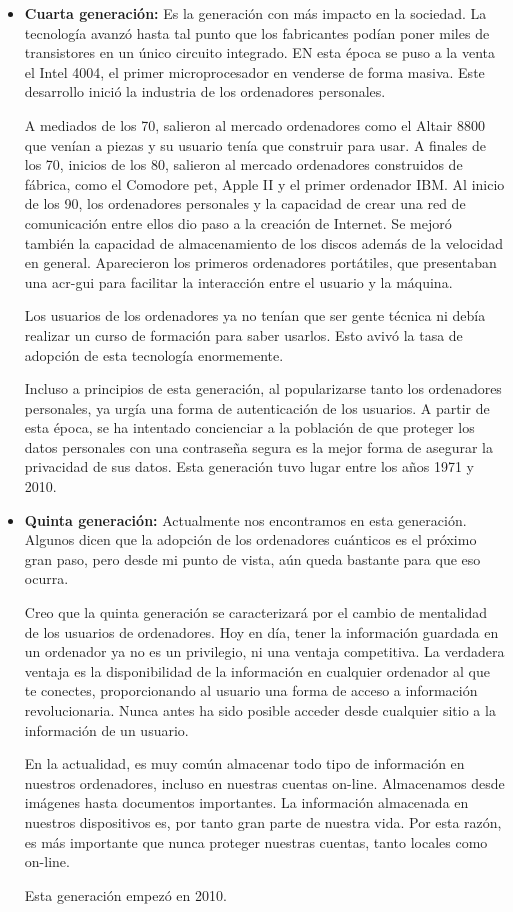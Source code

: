 \documentclass[titlepage, 12pt, a4paper]{article}
\begin{document}
\begin{itemize}
	\item{\textbf{Cuarta generación: }}Es la generación con más impacto en la sociedad. La tecnología avanzó hasta tal punto que los fabricantes podían poner miles de transistores en un único circuito integrado. EN esta época se puso a la venta el Intel 4004, el primer microprocesador en venderse de forma masiva. Este desarrollo inició la industria de los ordenadores personales.\par A mediados de los 70, salieron al mercado ordenadores como el Altair 8800 que venían a piezas y su usuario tenía que construir para usar. A finales de los 70, inicios de los 80, salieron al mercado ordenadores construidos de fábrica, como el Comodore pet, Apple II y el primer ordenador IBM. Al inicio de los 90, los ordenadores personales y la capacidad de crear una red de comunicación entre ellos dio paso a la creación de Internet. Se mejoró también la capacidad de almacenamiento de los discos además de la velocidad en general. Aparecieron los primeros ordenadores portátiles, que presentaban una \gls{acr-gui} para facilitar la interacción entre el usuario y la máquina.\par Los usuarios de los ordenadores ya no tenían que ser gente técnica ni debía realizar un curso de formación para saber usarlos. Esto avivó la tasa de adopción de esta tecnología enormemente.\par
		Incluso a principios de esta generación, al popularizarse tanto los ordenadores personales, ya urgía una forma de autenticación de los usuarios. A partir de esta época, se ha intentado concienciar a la población de que proteger los datos personales con una contraseña segura es la mejor forma de asegurar la privacidad de sus datos.
		Esta generación tuvo lugar entre los años 1971 y 2010. \par
	\item{\textbf{Quinta generación: }}Actualmente nos encontramos en esta generación. Algunos dicen que la adopción de los ordenadores cuánticos es el próximo gran paso, pero desde mi punto de vista, aún queda bastante para que eso ocurra.\par Creo que la quinta generación se caracterizará por el cambio de mentalidad de los usuarios de ordenadores. Hoy en día, tener la información guardada en un ordenador ya no es un privilegio, ni una ventaja competitiva. La verdadera ventaja es la disponibilidad de la información en cualquier ordenador al que te conectes, proporcionando al usuario una forma de acceso a información revolucionaria. Nunca antes ha sido posible acceder desde cualquier sitio a la información de un usuario. \par
		En la actualidad, es muy común almacenar todo tipo de información en nuestros ordenadores, incluso en nuestras cuentas on-line. Almacenamos desde imágenes hasta documentos importantes. La información almacenada en nuestros dispositivos es, por tanto gran parte de nuestra vida. Por esta razón, es más importante que nunca proteger nuestras cuentas, tanto locales como on-line. \par
		Esta generación empezó en 2010.
\end{itemize} \par
\end{document}
